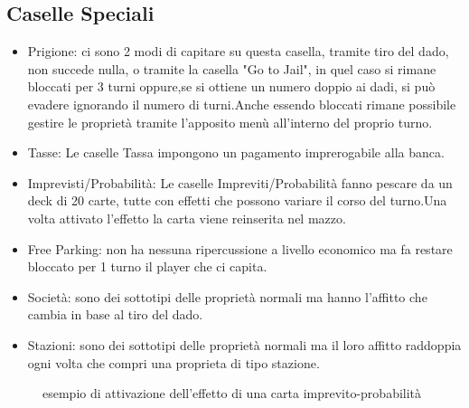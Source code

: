 \subsection{Caselle Speciali}
\begin{itemize}
    \item Prigione: ci sono 2 modi di capitare su questa casella, tramite tiro del dado, non succede nulla, o tramite la casella "Go to Jail", in quel caso si rimane bloccati per 3 turni oppure,\newline se si ottiene un numero doppio ai dadi, si può evadere ignorando il numero di turni.\newline Anche essendo bloccati rimane possibile gestire le proprietà tramite l'apposito menù all'interno del proprio turno.
    \item Tasse: Le caselle Tassa impongono un pagamento imprerogabile alla banca.
    \item Imprevisti/Probabilità: Le caselle Impreviti/Probabilità fanno pescare da un deck di 20 carte, tutte con effetti che possono variare il corso del turno.\newline Una volta attivato l'effetto la carta viene reinserita nel mazzo. 
    \item Free Parking: non ha nessuna ripercussione a livello economico ma fa restare bloccato per 1 turno il player che ci capita.
    \item Società: sono dei sottotipi delle proprietà normali ma hanno l'affitto che cambia in base al tiro del dado.
    \item Stazioni: sono dei sottotipi delle proprietà normali ma il loro affitto raddoppia ogni volta che compri una proprieta di tipo stazione.
\end{itemize}
\begin{figure}[H]
    \centering
    \caption{esempio di attivazione dell'effetto di una carta imprevito-probabilità}
	\label{img:gamescreen13}
\end{figure}
